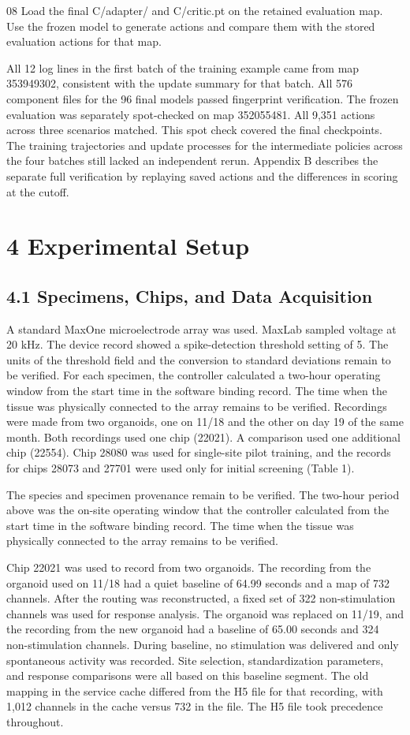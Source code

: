 \documentclass{article}
\begin{document}
08 Load the final C/adapter/ and C/critic.pt on the retained evaluation map. Use the frozen model to generate actions and compare them with the stored evaluation actions for that map.


All 12 log lines in the first batch of the training example came from map 353949302, consistent with the update summary for that batch. All 576 component files for the 96 final models passed fingerprint verification. The frozen evaluation was separately spot-checked on map 352055481. All 9,351 actions across three scenarios matched. This spot check covered the final checkpoints. The training trajectories and update processes for the intermediate policies across the four batches still lacked an independent rerun. Appendix B describes the separate full verification by replaying saved actions and the differences in scoring at the cutoff.


\section*{4 Experimental Setup}


\subsection*{4.1 Specimens, Chips, and Data Acquisition}


A standard MaxOne microelectrode array was used. MaxLab sampled voltage at 20 kHz. The device record showed a spike-detection threshold setting of 5. The units of the threshold field and the conversion to standard deviations remain to be verified. For each specimen, the controller calculated a two-hour operating window from the start time in the software binding record. The time when the tissue was physically connected to the array remains to be verified. Recordings were made from two organoids, one on 11/18 and the other on day 19 of the same month. Both recordings used one chip (22021). A comparison used one additional chip (22554). Chip 28080 was used for single-site pilot training, and the records for chips 28073 and 27701 were used only for initial screening (Table 1).


The species and specimen provenance remain to be verified. The two-hour period above was the on-site operating window that the controller calculated from the start time in the software binding record. The time when the tissue was physically connected to the array remains to be verified.


Chip 22021 was used to record from two organoids. The recording from the organoid used on 11/18 had a quiet baseline of 64.99 seconds and a map of 732 channels. After the routing was reconstructed, a fixed set of 322 non-stimulation channels was used for response analysis. The organoid was replaced on 11/19, and the recording from the new organoid had a baseline of 65.00 seconds and 324 non-stimulation channels. During baseline, no stimulation was delivered and only spontaneous activity was recorded. Site selection, standardization parameters, and response comparisons were all based on this baseline segment. The old mapping in the service cache differed from the H5 file for that recording, with 1,012 channels in the cache versus 732 in the file. The H5 file took precedence throughout.
\end{document}
